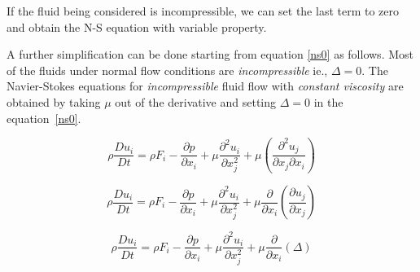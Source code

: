

If the fluid being considered is incompressible, we can set the last term to zero and obtain the N-S equation with variable property.

A further simplification can be done starting from equation \ref{ns0} as follows. Most of the fluids under normal flow conditions are {\em incompressible} ie., $\Delta=0$. The Navier-Stokes equations for {\em incompressible} fluid flow with {\em constant viscosity} are obtained by taking $\mu$ out of the derivative and setting $\Delta=0$ in the equation~\ref{ns0}.

\begin{equation*}
\rho \frac{Du_i}{Dt} = \rho F_i -  \frac{\partial p}{\partial x_i} +  
\mu \frac{\partial^2 u_i}{\partial x_j^2} + \mu \left(\frac{\partial^2 u_j}{\partial x_j \partial x_i} \right) 
\end{equation*} 

\begin{equation*}
\rho \frac{Du_i}{Dt} = \rho F_i -  \frac{\partial p}{\partial x_i} +  
\mu \frac{\partial^2 u_i}{\partial x_j^2} + \mu \frac{\partial}{\partial x_i} \left(\frac{\partial u_j}{\partial x_j} \right) 
\end{equation*} 

\begin{equation*}
\rho \frac{Du_i}{Dt} = \rho F_i -  \frac{\partial p}{\partial x_i} +  
\mu \frac{\partial^2 u_i}{\partial x_j^2} + \mu \frac{\partial}{\partial x_i} \left(\Delta \right) 
\end{equation*} 

